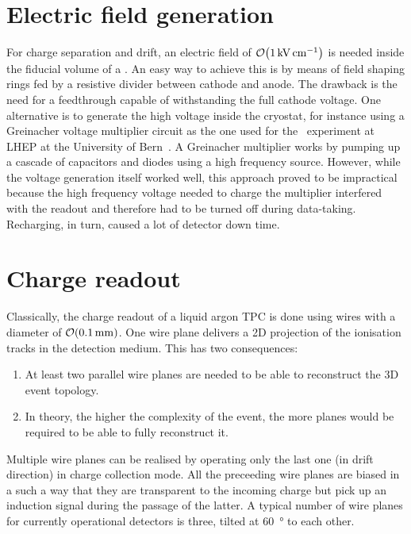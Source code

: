 \section{Electric field generation\label{sec:lartpc_efield}}

For charge separation and drift, an electric field of $\order{\SI{1}{\kilo\volt\per\centi\metre}}$ is needed inside the fiducial volume of a \lartpc.
An easy way to achieve this is by means of field shaping rings fed by a resistive divider between cathode and anode.
The drawback is the need for a feedthrough capable of withstanding the full cathode voltage.
One alternative is to generate the high voltage inside the cryostat, for instance using a Greinacher voltage multiplier circuit as the one used for the \AT\ experiment at LHEP at the University of Bern~\cite{AT}.
A Greinacher multiplier works by pumping up a cascade of capacitors and diodes using a high frequency source.
However, while the voltage generation itself worked well, this approach proved to be impractical because the high frequency voltage needed to charge the multiplier interfered with the readout and therefore had to be turned off during data-taking.
Recharging, in turn, caused a lot of detector down time.


\section{Charge readout\label{sec:lartpc_charge-ro}}

Classically, the charge readout of a liquid argon TPC is done using wires with a diameter of $\order{\SI{.1}{\milli\metre}}$.
One wire plane delivers a 2D projection of the ionisation tracks in the detection medium.
This has two consequences:
\begin{enumerate}
	\item At least two parallel wire planes are needed to be able to reconstruct the 3D event topology.
	\item In theory, the higher the complexity of the event, the more planes would be required to be able to fully reconstruct it.
\end{enumerate}
Multiple wire planes can be realised by operating only the last one (in drift direction) in charge collection mode.
All the preceeding wire planes are biased in a such a way that they are transparent to the incoming charge but pick up an induction signal during the passage of the latter.
A typical number of wire planes for currently operational detectors is three, tilted at \SI{60}{\degree} to each other.


